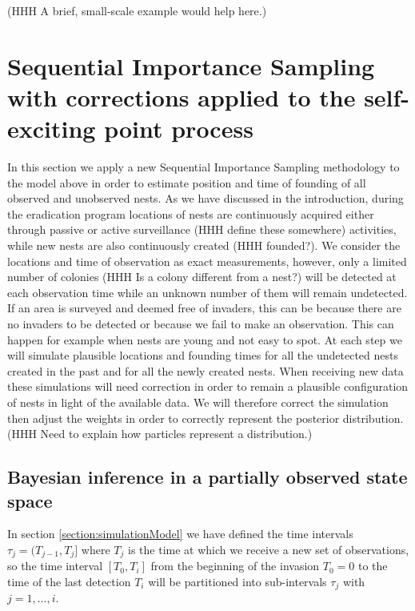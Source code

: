 \documentclass{article}
\begin{document}
(HHH A brief, small-scale example would help here.)


\section{Sequential Importance Sampling with corrections applied to the self-exciting point process} \label{sec:SISMethod}

In this section we apply a new Sequential Importance Sampling methodology to the model above in order to estimate position and time of founding of all observed and unobserved nests. As we have discussed in the introduction, during the eradication program locations of nests are continuously acquired either through passive or active surveillance (HHH define these somewhere) activities, while new nests are also continuously created (HHH founded?). We consider the locations and time of observation as exact measurements, however, only a limited number of colonies (HHH Is a colony different from a nest?) will be detected at each observation time while an unknown number of them will remain undetected. If an area is surveyed and deemed free of invaders, this can be because there are no invaders to be detected or because we fail to make an observation. This can happen for example when nests are young and not easy to spot. At each step we will simulate plausible locations and founding times for all the undetected nests created in the past and for all the newly created nests. When receiving new data these simulations will need correction in order to remain a plausible configuration of nests in light of the available data. We will therefore correct the simulation then adjust the weights in order to correctly represent the posterior distribution. (HHH Need to explain how particles represent a distribution.)

\subsection{Bayesian inference in a partially observed state space} \label{subsec:POS}

In section \ref{section:simulationModel} we have defined the time intervals $\tau_j = (T_{j-1}, T_j]$ where $T_j$ is the time at which we receive a new set of observations, so the time interval $[T_0, T_i]$ from the beginning of the invasion $T_0=0$ to the time of the last detection $T_i$ will be partitioned into sub-intervals $\tau_j$ with $j = 1, \dots, i$.
\end{document}
